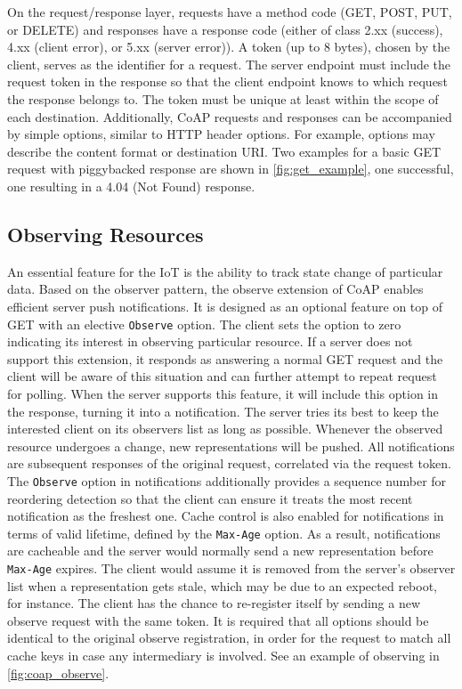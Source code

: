 On the request/response layer, requests have a method code (GET, POST, PUT, or DELETE) and responses have a response code (either of class 2.xx (success), 4.xx (client error), or 5.xx (server error)). A token (up to 8 bytes), chosen by the client, serves as the identifier for a request. The server endpoint must include the request token in the response so that the client endpoint knows to which request the response belongs to. The token must be unique at least within the scope of each destination. Additionally, CoAP requests and responses can be accompanied by simple options, similar to HTTP header options. For example, options may describe the content format or destination URI. Two examples for a basic GET request with piggybacked response are shown in \autoref{fig:get_example}, one successful, one resulting in a 4.04 (Not Found) response.

\subsection{Observing Resources} \label{observe_resource}

An essential feature for the IoT is the ability to track state change of particular data. Based on the observer pattern, the observe extension of CoAP \autocite{coap_observe} enables efficient server push notifications. It is designed as an optional feature on top of GET with an elective \verb|Observe| option. The client sets the option to zero indicating its interest in observing particular resource. If a server does not support this extension, it responds as answering a normal GET request and the client will be aware of this situation and can further attempt to repeat request for polling. When the server supports this feature, it will include this option in the response, turning it into a notification. The server tries its best to keep the interested client on its observers list as long as possible. Whenever the observed resource undergoes a change, new representations will be pushed. All notifications are subsequent responses of the original request, correlated via the request token. The \verb|Observe| option in notifications additionally provides a sequence number for reordering detection so that the client can ensure it treats the most recent notification as the freshest one. Cache control is also enabled for notifications in terms of valid lifetime, defined by the \verb|Max-Age| option. As a result, notifications are cacheable and the server would normally send a new representation before \verb|Max-Age| expires. The client would assume it is removed from the server's observer list when a representation gets stale, which may be due to an expected reboot, for instance. The client has the chance to re-register itself by sending a new observe request with the same token. It is required that all options should be identical to the original observe registration, in order for the request to match all cache keys in case any intermediary is involved. See an example of observing in \autoref{fig:coap_observe}.

